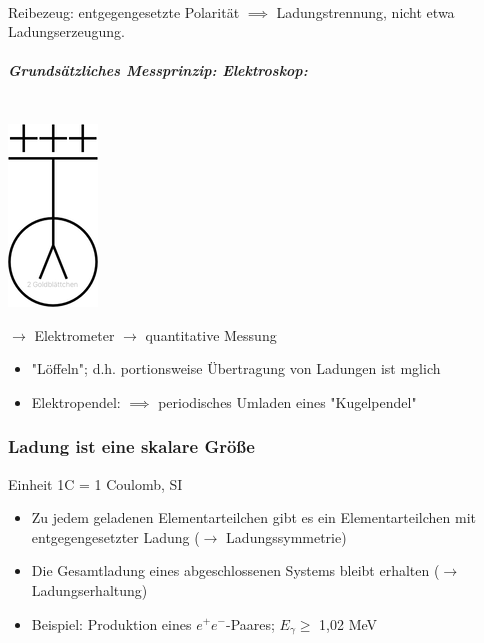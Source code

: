 \documentclass[11pt]{article}
\begin{document}
			\linebreak\\
			Reibezeug: entgegengesetzte Polarit\"{a}t
			$\implies$ Ladungstrennung, nicht etwa Ladungserzeugung.
			\linebreak\\
			\newpage
			\subparagraph {Grunds\"{a}tzliches Messprinzip: Elektroskop:} \hfill \\
			
			\includegraphics{skizzen/14/14_1B1}
			
			$\rightarrow$ Elektrometer $\rightarrow$ quantitative Messung
			\begin{itemize}
				\item "L\"{o}ffeln"; d.h. portionsweise Übertragung von Ladungen ist mglich
				\item Elektropendel: $\implies$ periodisches Umladen eines "Kugelpendel"
			\end{itemize}
			
			\subsubsection{Ladung ist eine skalare Gr\"{o}\ss{}e } Einheit 1C = 1 Coulomb, SI
				\begin{itemize}
					\item Zu jedem geladenen Elementarteilchen gibt es ein Elementarteilchen mit entgegengesetzter Ladung ($\rightarrow$ Ladungssymmetrie)
					\item Die Gesamtladung eines abgeschlossenen Systems bleibt erhalten ($\rightarrow$ Ladungserhaltung)
					\item Beispiel: Produktion eines $ e^+e^- $-Paares; $ E_\gamma \geq $ 1,02 MeV
				\end{itemize}
				
\end{document}
